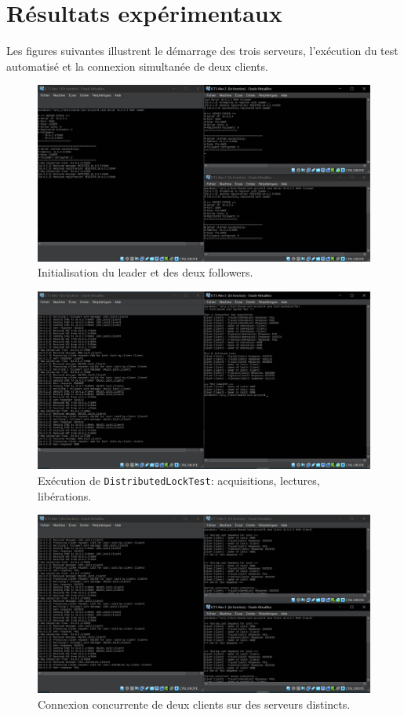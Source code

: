 \documentclass[a4paper,11pt]{article}
\begin{document}
\section{Résultats expérimentaux}
Les figures suivantes illustrent le démarrage des trois serveurs, l'exécution du test automatisé et la connexion simultanée de deux clients.

\begin{figure}[H]
\centering
\includegraphics[width=0.9\linewidth]{images/Capture_connection des 3 serveurs .JPG}
\caption{Initialisation du leader et des deux followers.}
\end{figure}

\begin{figure}[H]
\centering
\includegraphics[width=0.9\linewidth]{images/Capture_distributed_lock_test.JPG}
\caption{Exécution de \texttt{DistributedLockTest}: acquisitions, lectures, libérations.}
\end{figure}

\begin{figure}[H]
\centering
\includegraphics[width=0.9\linewidth]{images/Capture_ connection de deux clients .JPG}
\caption{Connexion concurrente de deux clients sur des serveurs distincts.}
\end{figure}
\end{document}
